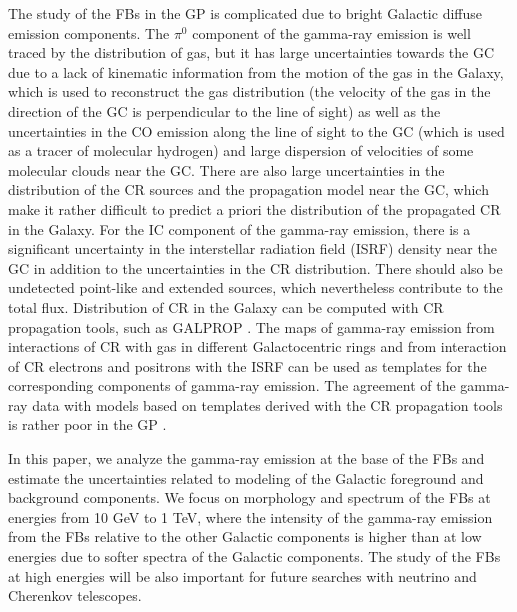 The study of the FBs in the GP is complicated due to bright Galactic diffuse emission components.
The $\pi^0$ component of the gamma-ray emission is well traced by the distribution of gas,
but it has large uncertainties towards the GC due to a lack of kinematic information from the motion of the gas in the 
Galaxy, which is used to reconstruct the gas distribution
(the velocity of the gas in the direction of the GC is perpendicular to the line of sight)
as well as the uncertainties in the CO emission along the line of sight to the GC (which is used as a tracer of molecular hydrogen)
and large dispersion of velocities of some molecular clouds near the GC. 
There are also large uncertainties in the distribution of the CR sources and the propagation model near the GC,
which make it rather difficult to predict a priori 
the distribution of the propagated CR in the Galaxy.
For the IC component of the gamma-ray emission, 
there is a significant uncertainty in the interstellar radiation field (ISRF) density near the GC \citep[e.g.,][]{2017ApJ...846...67P} in addition to 
the uncertainties in the CR distribution.
There should also be undetected point-like and extended sources, which nevertheless contribute to the total flux.
Distribution of CR in the Galaxy can be computed with CR propagation tools, such as GALPROP \citep{2007ARNPS..57..285S}.
The maps of gamma-ray emission from interactions of CR with gas in different Galactocentric rings and from interaction
of CR electrons and positrons with the ISRF can be used as templates for the corresponding components
of gamma-ray emission.
The agreement of the gamma-ray data with models based on templates derived with the CR propagation tools
is rather poor in the GP %
\citep[e.g.,][]{2012ApJ...750....3A, 2017ApJ...840...43A}.

In this paper, we analyze the gamma-ray emission at the base of the FBs and 
estimate the uncertainties %
related to modeling of the Galactic foreground and background components.
We focus on morphology and spectrum of the FBs at energies from 10 GeV to 1 TeV,
where the intensity of the gamma-ray emission from the FBs 
relative to the other Galactic components
is higher than at low energies due to softer spectra of the Galactic components.
The study of the FBs at high energies will be also important for future searches with neutrino and Cherenkov telescopes.

